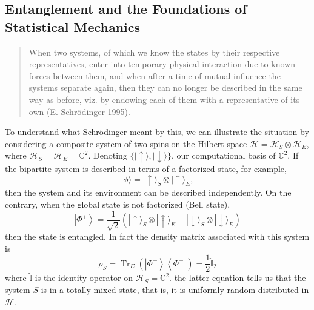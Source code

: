 \subsection{Entanglement and the Foundations of Statistical Mechanics}
\begin{quote}
When two systems, of which we know the states by their respective representatives, enter into temporary physical interaction due to known forces between
them, and when after a time of mutual influence the systems separate again, then
they can no longer be described in the same way as before, viz. by endowing each
of them with a representative of its own (E. Schr\"odinger 1995\cite{schrodinger_discussion_1935}).
\end{quote}
To understand what Schr\"odinger meant by this, we can illustrate the situation by considering a composite system of two spins on the Hilbert space $\mathcal{H}=\mathcal{H}_S\otimes \mathcal{H}_{E}$, where $\mathcal{H}_{S}=\mathcal{H}_{E} = \mathbb{C}^{2}$. Denoting $\{|\uparrow\rangle,|\downarrow\rangle\}$, our computational basis of $\mathbb{C}^{2}$\cite{ekert_basic_2000, nielsen_quantum_2000, edwin_optimal_1979}.
If the bipartite system is described in terms of a factorized state, for example,
\begin{equation}
|\phi\rangle=|\uparrow\rangle_{S} \otimes|\uparrow\rangle_{E},
\label{CH1:Entanglement_example_1}
\end{equation}
then the system and its environment can be described independently. On the contrary, when the global state is not factorized (Bell state),
\begin{equation}
\left|\Phi^{+}\right\rangle=\frac{1}{\sqrt{2}}\left(|\uparrow\rangle_{S} \otimes|\uparrow\rangle_{E}+|\downarrow\rangle_{S} \otimes|\downarrow\rangle_{E}\right)
\label{CH1:Entanglement_example_2}
\end{equation}
then the state is entangled. In fact the density matrix associated with this system is
\begin{equation}
\rho_{S}=\operatorname{Tr}_{E}\left(\left|\Phi^{+}\right\rangle\left\langle\Phi^{+}\right|\right)=\frac{1}{2} \hat{\mathbb{I}}_{2}
\label{CH1:Entanglement_example_3}
\end{equation}
where $\hat{\mathbb{I}}$ is the identity operator on $\mathcal{H}_S=\mathbb{C}^2$. the latter equation tells us that the system $S$ is in a totally mixed state, that is, it is uniformly random distributed in $\mathcal{H}$.\\

